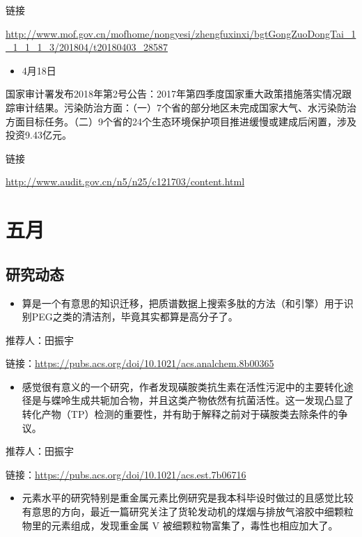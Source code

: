 \documentclass[]{book}
\providecommand{\tightlist}{%
  \setlength{\itemsep}{0pt}\setlength{\parskip}{0pt}}
\begin{document}
链接

\url{http://www.mof.gov.cn/mofhome/nongyesi/zhengfuxinxi/bgtGongZuoDongTai_1_1_1_1_3/201804/t20180403_28587}

\begin{itemize}
\tightlist
\item
  4月18日
\end{itemize}

国家审计署发布2018年第2号公告：2017年第四季度国家重大政策措施落实情况跟踪审计结果。污染防治方面：（一）7个省的部分地区未完成国家大气、水污染防治方面目标任务。（二）9个省的24个生态环境保护项目推进缓慢或建成后闲置，涉及投资9.43亿元。

链接

\url{http://www.audit.gov.cn/n5/n25/c121703/content.html}

\hypertarget{ux4e94ux6708}{%
\section*{五月}\label{ux4e94ux6708}}

\hypertarget{ux7814ux7a76ux52a8ux6001-6}{%
\subsection*{研究动态}\label{ux7814ux7a76ux52a8ux6001-6}}

\begin{itemize}
\tightlist
\item
  算是一个有意思的知识迁移，把质谱数据上搜索多肽的方法（和引擎）用于识别PEG之类的清洁剂，毕竟其实都算是高分子了。
\end{itemize}

推荐人：田振宇

链接：\url{https://pubs.acs.org/doi/10.1021/acs.analchem.8b00365}

\begin{itemize}
\tightlist
\item
  感觉很有意义的一个研究，作者发现磺胺类抗生素在活性污泥中的主要转化途径是与蝶呤生成共轭加合物，并且这类产物依然有抗菌活性。这一发现凸显了转化产物（TP）检测的重要性，并有助于解释之前对于磺胺类去除条件的争议。
\end{itemize}

推荐人：田振宇

链接：\url{https://pubs.acs.org/doi/10.1021/acs.est.7b06716}

\begin{itemize}
\tightlist
\item
  元素水平的研究特别是重金属元素比例研究是我本科毕设时做过的且感觉比较有意思的方向，最近一篇研究关注了货轮发动机的煤烟与排放气溶胶中细颗粒物里的元素组成，发现重金属 V 被细颗粒物富集了，毒性也相应加大了。
\end{itemize}
\end{document}
